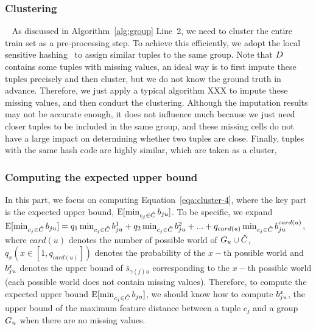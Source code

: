 \subsubsection{Clustering}~\label{subsec:clustering}
As discussed in Algorithm~\ref{alg:group} Line~2, we need to cluster the entire train set as a pre-processing step. To achieve this efficiently, we adopt the local sensitive hashing~\cite{} to assign similar tuples to the same group. 
%
Note that $D$ contains some tuples with missing values, an ideal way is to first impute these tuples precisely and then cluster, but we do not know the ground truth in advance. Therefore, we just apply a typical algorithm \ie XXX to impute these missing values, and then conduct the clustering. Although the imputation results may  not be accurate enough, it does not influence much because we just need closer tuples to be included in the same group, and these missing cells do not have a large impact on determining whether two tuples are close. 
%
Finally, tuples with the same hash code are highly similar, which are taken as a cluster,
%
 


\subsubsection{Computing the expected upper bound} In this part, we focus on computing Equation~\ref{eqa:cluster-4}, where the key part is the expected upper bound, \ie $\mathrm{E}[\min_{c_j\in \hat{C}}b_{ju}]$. To be specific, we expand $\mathrm{E}[\min_{c_j\in \hat{C}}b_{ju}] = q_1\min_{c_j\in \hat{C}}b_{ju}^1 + q_2\min_{c_j\in \hat{C}}b_{ju}^2 + ... +q_{card(u)}\min_{c_j\in \hat{C}}b_{ju}^{card(u)}$, where $card(u)$ denotes the number of possible world of $G_u \cup \hat{C}$, $q_x    (x\in [1, q_{card(u)}])$ denotes the probability of the $x-$th possible world and  $b_{ju}^x$ denotes the upper bound of $\overline{s}_{\gamma(j)u}$ corresponding to the $x-$th possible world (each possible world does not contain missing values). 
%
Therefore, to compute the expected upper bound $\mathrm{E}[\min_{c_j\in \hat{C}}b_{ju}]$, we should know how to compute $b_{ju}^x$, \ie the upper bound of the maximum feature distance between a tuple $c_j$ and a group $G_u$ when there are no missing values.

